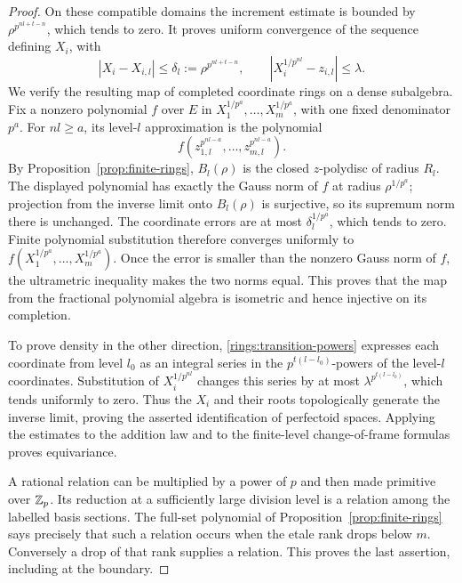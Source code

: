 \begin{proof}
On these compatible domains the increment estimate is bounded by
$\rho^{p^{nl+t-n}}$, which tends to zero.  It proves uniform convergence
of the sequence defining $X_i$, with
\[
 |X_i-X_{i,l}|\leq\delta_l:=\rho^{p^{nl+t-n}},
 \qquad |X_i^{1/p^{nl}}-z_{i,l}|\leq\lambda.
\]
We verify the resulting map of completed coordinate rings on a
dense subalgebra.  Fix a nonzero polynomial $f$ over $E$ in
$X_1^{1/p^a},\ldots,X_m^{1/p^a}$, with one fixed denominator $p^a$.
For $nl\geq a$, its level-$l$ approximation is the polynomial
\[
 f(z_{1,l}^{p^{nl-a}},\ldots,z_{m,l}^{p^{nl-a}}).
\]
By Proposition~\ref{prop:finite-rings}, $B_l(\rho)$ is the closed
$z$-polydisc of radius $R_l$.  The displayed polynomial has exactly
the Gauss norm of $f$ at radius $\rho^{1/p^a}$; projection from the
inverse limit onto $B_l(\rho)$ is surjective, so its supremum norm
there is unchanged.  The coordinate errors are at most
$\delta_l^{1/p^a}$, which tends to zero.  Finite polynomial
substitution therefore converges uniformly to
$f(X_1^{1/p^a},\ldots,X_m^{1/p^a})$.  Once the error is smaller
than the nonzero Gauss norm of $f$, the ultrametric inequality makes
the two norms equal.  This proves that the map from the fractional
polynomial algebra is isometric and hence injective on its completion.

To prove density in the other direction,
\eqref{rings:transition-powers} expresses each coordinate from level
$l_0$ as an integral series in the $p^{t(l-l_0)}$-powers of the level-$l$
coordinates.  Substitution of $X_i^{1/p^{nl}}$ changes this series by at
most $\lambda^{p^{t(l-l_0)}}$, which tends uniformly to zero.  Thus the
$X_i$ and their roots topologically generate the inverse limit, proving
the asserted identification of perfectoid spaces.  Applying the estimates
to the addition law and to the finite-level change-of-frame formulas
proves equivariance.

A rational relation can be multiplied by a power of $p$ and then made
primitive over $\mathbb Z_p$.  Its reduction at a sufficiently large division
level is a relation among the labelled basis sections.  The full-set
polynomial of Proposition~\ref{prop:finite-rings} says precisely that
such a relation occurs when the etale rank drops below $m$.  Conversely
a drop of that rank supplies a relation.  This proves the last
assertion, including at the boundary.
\end{proof}


